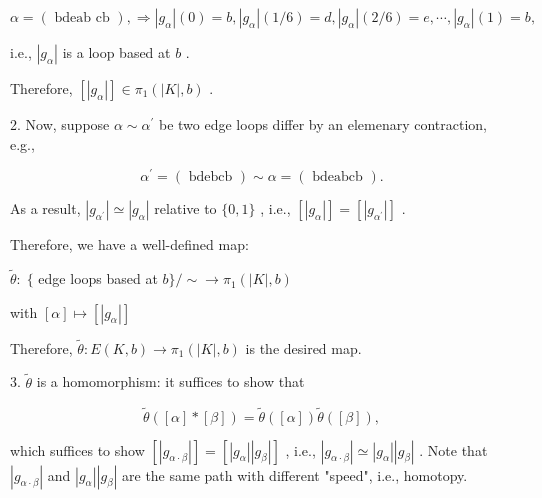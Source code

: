 \[
\alpha  = \left( \text{ bdeab cb }\right) , \Rightarrow  \left| {g}_{\alpha }\right| \left( 0\right)  = b,\left| {g}_{\alpha }\right| \left( {1/6}\right)  = d,\left| {g}_{\alpha }\right| \left( {2/6}\right)  = e,\cdots ,\left| {g}_{\alpha }\right| \left( 1\right)  = b,
\]

i.e., \(\left| {g}_{\alpha }\right|\) is a loop based at \(b\) .

Therefore, \(\left\lbrack  \left| {g}_{\alpha }\right| \right\rbrack   \in  {\pi }_{1}\left( {\left| K\right| ,b}\right)\) .

2. Now, suppose \(\alpha  \sim  {\alpha }^{\prime }\) be two edge loops differ by an elemenary contraction, e.g.,

\[
{\alpha }^{\prime } = \left( \text{ bdebcb }\right)  \sim  \alpha  = \left( \text{ bdeabcb }\right) .
\]

As a result, \(\left| {g}_{{\alpha }^{\prime }}\right|  \simeq  \left| {g}_{\alpha }\right|\) relative to \(\{ 0,1\}\) , i.e., \(\left\lbrack  \left| {g}_{\alpha }\right| \right\rbrack   = \left\lbrack  \left| {g}_{{\alpha }^{\prime }}\right| \right\rbrack\) .

Therefore, we have a well-defined map:

\(\widetilde{\theta } : \;\{\) edge loops based at \(b\} / \sim   \rightarrow  {\pi }_{1}\left( {\left| K\right| ,b}\right)\)

with \(\left\lbrack  \alpha \right\rbrack   \mapsto  \left\lbrack  \left| {g}_{\alpha }\right| \right\rbrack\)

Therefore, \(\widetilde{\theta } : E\left( {K,b}\right)  \rightarrow  {\pi }_{1}\left( {\left| K\right| ,b}\right)\) is the desired map.

3. \(\widetilde{\theta }\) is a homomorphism: it suffices to show that

\[
\widetilde{\theta }\left( {\left\lbrack  \alpha \right\rbrack   * \left\lbrack  \beta \right\rbrack  }\right)  = \widetilde{\theta }\left( \left\lbrack  \alpha \right\rbrack  \right) \widetilde{\theta }\left( \left\lbrack  \beta \right\rbrack  \right) ,
\]

which suffices to show \(\left\lbrack  \left| {g}_{\alpha  \cdot  \beta }\right| \right\rbrack   = \left\lbrack  {\left| {g}_{\alpha }\right| \left| {g}_{\beta }\right| }\right\rbrack\) , i.e., \(\left| {g}_{\alpha  \cdot  \beta }\right|  \simeq  \left| {g}_{\alpha }\right| \left| {g}_{\beta }\right|\) . Note that \(\left| {g}_{\alpha  \cdot  \beta }\right|\) and \(\left| {g}_{\alpha }\right| \left| {g}_{\beta }\right|\) are the same path with different "speed", i.e., homotopy.

